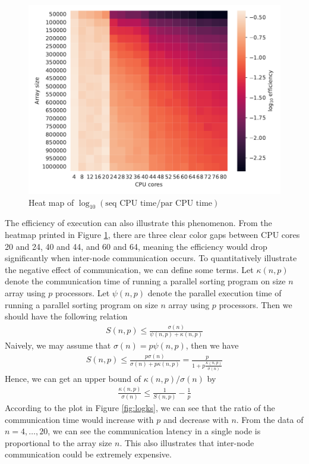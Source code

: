 \documentclass[twoside,12pt]{article}
\theoremstyle{definition}
\theoremstyle{remark}
\begin{document}
\begin{figure}[t!]
    \centering
    \includegraphics[width=\textwidth]{../analysis/logeff_heatmap.pdf}
    \caption{Heat map of $\log_{10} (\text{seq CPU time}/\text{par CPU time})$ }
    \label{fig:logeff}
\end{figure}


The efficiency of execution can also illustrate this phenomenon.
From the heatmap printed in Figure \ref{fig:logeff}, there are three clear color
gaps between CPU cores 20 and 24, 40 and 44, and 60 and 64, meaning the efficiency
would drop significantly when inter-node communication occurs.
To quantitatively illustrate the negative effect of communication, we can
define some terms.
Let $\kappa(n, p)$ denote the communication time of running a parallel sorting
program on size $n$ array using $p$ processors.
Let $\psi(n, p)$ denote the parallel execution time of running a parallel sorting
program on size $n$ array using $p$ processors.
Then we should have the following relation
\begin{align}
    S(n, p)\leq \frac{\sigma(n)}{\psi(n, p) + \kappa(n, p)}
\end{align}
Naively, we may assume that $\sigma(n)=p\psi(n, p)$, then we have 
\begin{align}
    S(n, p)\leq \frac{p\sigma(n)}{\sigma(n) + p\kappa(n, p)} = 
    \frac{p}{1 + p\frac{\kappa(n,p)}{\sigma(n)}}
\end{align}
Hence, we can get an upper bound of $\kappa(n,p)/\sigma(n)$ by
\begin{align}
    \frac{\kappa(n, p)}{\sigma(n)} \leq \frac{1}{S(n,p)} - \frac{1}{p}
\end{align}
According to the plot in Figure \ref{fig:logks}, we can see that the ratio
of the communication time would increase with $p$ and decrease with $n$.
From the data of $n=4,\dots,20$, we can see the communication latency
in a single node is proportional to the array size $n$.
This also illustrates that inter-node communication could be extremely
expensive.
\end{document}

